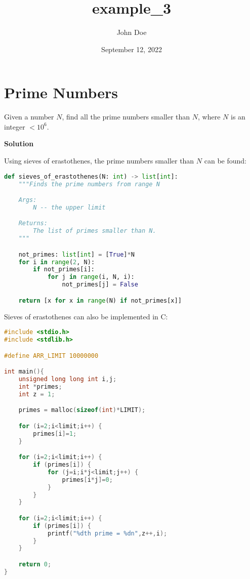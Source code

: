 \documentclass[12pt, UTF8]{article}
\title{example\_3}
\author{John Doe}
\date{September 12, 2022}
\begin{document}
	\maketitle
	
	\section*{Prime Numbers}
	
	Given a number $N$, find all the prime numbers smaller than $N$, where $N$ is an integer $< 10^6$.
	
	\textbf{Solution}
	
	Using sieves of erastothenes, the prime numbers smaller than $N$ can be found:
	
\begin{lstlisting}[language=Python]
def sieves_of_erastothenes(N: int) -> list[int]:
    """Finds the prime numbers from range N

    Args:
        N -- the upper limit

    Returns:
        The list of primes smaller than N.
    """

    not_primes: list[int] = [True]*N
    for i in range(2, N):
        if not_primes[i]:
            for j in range(i, N, i):
                not_primes[j] = False

    return [x for x in range(N) if not_primes[x]]
\end{lstlisting}
	
	Sieves of erastothenes can also be implemented in C:
	
\begin{lstlisting}[language=C]
#include <stdio.h>
#include <stdlib.h>

#define ARR_LIMIT 10000000

int main(){
    unsigned long long int i,j;
    int *primes;
    int z = 1;

    primes = malloc(sizeof(int)*LIMIT);

    for (i=2;i<limit;i++) {
        primes[i]=1;
    }

    for (i=2;i<limit;i++) {
        if (primes[i]) {
            for (j=i;i*j<limit;j++) {
                primes[i*j]=0;
            }
        }
    }

    for (i=2;i<limit;i++) {
        if (primes[i]) {
            printf("%dth prime = %dn",z++,i);
        }
    }

    return 0;
}
\end{lstlisting}
\end{document}
